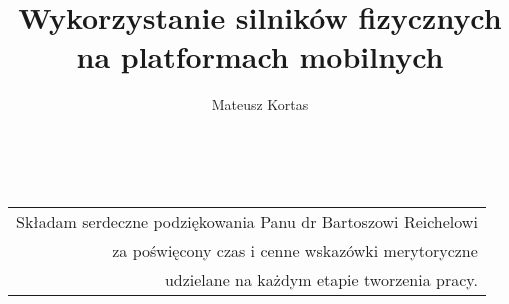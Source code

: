 ﻿\documentclass[12pt]{article}
\title{Wykorzystanie silników fizycznych na platformach mobilnych}
\author{Mateusz Kortas}
\begin{document}
	\sloppy %
    \renewcommand{\figurename}{Rysunek}    %
    \renewcommand{\tablename}{Tabela}     %
    \renewcommand{\lstlistingname}{Listing}     %
    \thispagestyle{empty}               %
    \stronatytulowa                     %

    \newpage
    ~   %
    \vfill
    {\sffamily
    
    \begin{flushright}
        \begin{tabular}{r}
        Składam serdeczne podziękowania Panu dr Bartoszowi Reichelowi \\
        za poświęcony czas i cenne wskazówki merytoryczne \\
        udzielane na każdym etapie tworzenia pracy.
        \end{tabular}
    \end{flushright}
    }
    \vskip0.5in
    \thispagestyle{empty}
    \newpage

    \hypersetup{linkcolor=black}
    \renewcommand{\cftbeforesecskip}{8pt}
    \renewcommand{\cftsecafterpnum}{\vskip 8pt}
    \renewcommand{\cftparskip}{3pt}
    \renewcommand{\cfttoctitlefont}{\Large\bfseries\sffamily}
    \renewcommand{\cftsecfont}{\bfseries\sffamily}
    \renewcommand{\cftsubsecfont}{\sffamily}
    \renewcommand{\cftsubsubsecfont}{\sffamily}
    \renewcommand{\cftparafont}{\sffamily}

    \tableofcontents    %
    \newpage

    
    \newpage

    \hypersetup{linkcolor=black}
    \renewcommand{\cftparskip}{3pt}
    \clearpage
    \renewcommand{\cftloftitlefont}{\Large\bfseries\sffamily}
    \listoffigures
    \newpage
    \renewcommand{\cftlottitlefont}{\Large\bfseries\sffamily}
    \listoftables
    \newpage
    \hypersetup{linkcolor=red}
\end{document}
